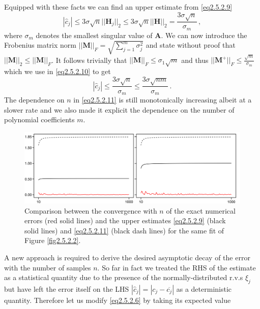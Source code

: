 \documentclass[../main.tex]{subfiles}
\begin{document}
Equipped with these facts we can find an upper estimate from \eqref{eq2.5.2.9}
\begin{equation}\label{eq2.5.2.10}
        |\hat{c}_{j}|\leq3\sigma\sqrt{n}||\boldsymbol{H}_{j}||_{2}\leq3\sigma\sqrt{n}||\boldsymbol{H}||_{2} = \frac{3\sigma\sqrt{n}}{\sigma_{m}}\,,
\end{equation}
where $\sigma_{m}$ denotes the smallest singular value of $\boldsymbol{A}$.
We can now introduce the Frobenius matrix norm $||\boldsymbol{M}||_{F}=\sqrt{\sum_{j=1}^{m}\sigma_{j}^{2}}$ and state without proof that $||\boldsymbol{M}||_{2}\leq||\boldsymbol{M}||_{F}$.
It follows trivially that $||\boldsymbol{M}||_{F}\leq\sigma_{1}\sqrt{m}$ and thus $||\boldsymbol{M}^{+}||_{F}\leq \frac{\sqrt{m}}{\sigma_{m}}$ which we use in \eqref{eq2.5.2.10} to get
\begin{equation}\label{eq2.5.2.11}
     |\hat{c}_{j}|\leq\frac{3\sigma\sqrt{n}}{\sigma_{m}}\leq\frac{3\sigma\sqrt{nm}}{\sigma_{m}}\,.
\end{equation}
The dependence on $n$ in \eqref{eq2.5.2.11} is still monotonically increasing albeit at a slower rate and we also made it explicit the dependence on the number of polynomial coefficients $m$.
\begin{figure}[H]
    \centering 
    \includegraphics[keepaspectratio, width=\textwidth]{../figures/fig2.5.2.3.png}
    \caption{Comparison between the convergence with $n$ of the exact numerical errors (red solid lines) and the upper estimates \eqref{eq2.5.2.9} (black solid lines) and \eqref{eq2.5.2.11} (black dash lines) for the same fit of Figure \ref{fig2.5.2.2}.}
    \label{fig2.5.2.3}
\end{figure}
A new approach is required to derive the desired asymptotic decay of the error with the number of samples $n$.
So far in fact we treated the RHS of the estimate as a statistical quantity due to the presence of the normally-distributed r.v.s $\xi_{j}$ but have left the error itself on the LHS $|\hat{c}_{j}| = |c_{j}-\overline{c_{j}}|$ as a deterministic quantity.
Therefore let us modify \eqref{eq2.5.2.6} by taking its expected value
\end{document}
